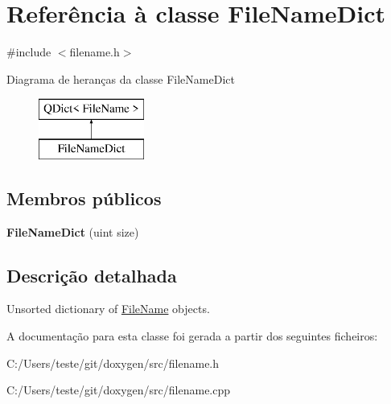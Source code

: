 \hypertarget{class_file_name_dict}{\section{Referência à classe File\-Name\-Dict}
\label{class_file_name_dict}
}


{\ttfamily \#include $<$filename.\-h$>$}

Diagrama de heranças da classe File\-Name\-Dict\begin{figure}[H]
\begin{center}
\leavevmode
\includegraphics[height=2.000000cm]{class_file_name_dict}
\end{center}
\end{figure}
\subsection*{Membros públicos}
\begin{DoxyCompactItemize}
\item 
\hypertarget{class_file_name_dict_a5e5772dfc6b0bcd3c916380bf5e9225c}{{\bfseries File\-Name\-Dict} (uint size)}\label{class_file_name_dict_a5e5772dfc6b0bcd3c916380bf5e9225c}

\end{DoxyCompactItemize}


\subsection{Descrição detalhada}
Unsorted dictionary of \hyperlink{class_file_name}{File\-Name} objects. 

A documentação para esta classe foi gerada a partir dos seguintes ficheiros\-:\begin{DoxyCompactItemize}
\item 
C\-:/\-Users/teste/git/doxygen/src/filename.\-h\item 
C\-:/\-Users/teste/git/doxygen/src/filename.\-cpp\end{DoxyCompactItemize}
